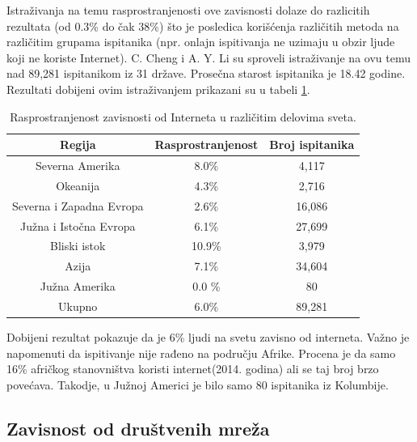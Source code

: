 \documentclass[a4paper]{article}
\begin{document}
Istraživanja na temu rasprostranjenosti ove zavisnosti dolaze do razlicitih rezultata (od 0.3\% do čak 38\%) što je posledica korišćenja različitih metoda na različitim grupama ispitanika (npr. onlajn ispitivanja ne uzimaju u obzir ljude koji ne koriste Internet).
C. Cheng i A. Y. Li su sproveli istraživanje na ovu temu nad 89,281 ispitanikom iz 31 države. \cite{prevalence}
Prosečna starost ispitanika je 18.42 godine.
Rezultati dobijeni ovim istraživanjem prikazani su u tabeli \ref{tab:tabela1}.

\begin{table}[h!]
\begin{center}
\caption{Rasprostranjenost zavisnosti od Interneta u različitim delovima sveta.}

\begin{tabular}{|c|c|c|} \hline
Regija& Rasprostranjenost& Broj ispitanika\\ \hline
Severna Amerika &8.0\% &4,117\\ \hline
Okeanija &4.3\% &2,716\\ \hline
Severna i Zapadna Evropa &2.6\% &16,086\\ \hline
Južna i Istočna Evropa &6.1\% &27,699\\ \hline
Bliski istok &10.9\% & 3,979\\ \hline
Azija &7.1\% &34,604\\ \hline
Južna Amerika & 0.0 \% & 80\\ \hline
Ukupno &6.0\% &89,281\\ \hline 
\end{tabular}
\label{tab:tabela1}
\end{center}
\end{table}

Dobijeni rezultat pokazuje da je 6\% ljudi na svetu zavisno od interneta. Važno je napomenuti da ispitivanje nije rađeno na području Afrike. Procena je da samo 16\% afričkog stanovništva koristi internet(2014. godina) ali se taj broj brzo povećava. Takodje, u Južnoj Americi je bilo samo 80 ispitanika iz Kolumbije.

\subsection{Zavisnost od društvenih mreža}
\label{subsec:podnaslovIP5}
\end{document}
